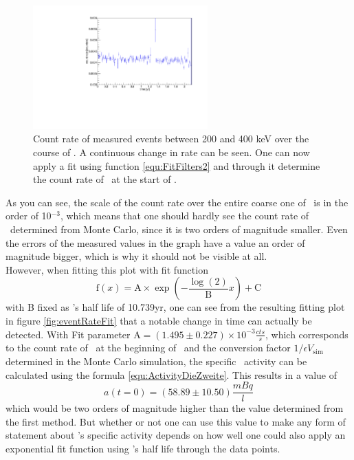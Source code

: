 \begin{figure}
	\centering
	\includegraphics[width=0.6\textwidth]{./Bilder/eventRate.pdf}
	\caption{
		Count rate of measured events between 200 and 400 keV over the course of \PII.
		A continuous change in rate can be seen. 
		One can now apply a fit using function \ref{equ:FitFilters2} and through it determine the count rate of \Kr\ at the start of \PII.
	}
	\label{fig:ChangeInEventRate}
\end{figure}

As you can see, the scale of the count rate over the entire coarse one of \PII\ is in the order of 10$^{-3}$, which means that one should hardly see the count rate of \Kr\ determined from Monte Carlo, since it is two orders of magnitude smaller.
Even the errors of the measured values in the graph have a value an order of magnitude bigger, which is why it should not be visible at all.
\\

However, when fitting this plot with fit function 
\begin{equation}
\mathrm{f}(x) = \mathrm{A}\times\exp\left(-\frac{\log(2)}{\mathrm{B}} x \right) + \mathrm{C}
\label{equ:FitFilters2}
\end{equation}
with B fixed as \Kr's half life of 10.739yr, one can see from the resulting fitting plot in figure \ref{fig:eventRateFit} that a notable change in time can actually be detected.
With Fit parameter A$ = (1.495\pm0.227) \times 10^{-3}\frac{\unit{cts}}{\unit{s}}$, which corresponds to the count rate of \Kr\ at the beginning of \PII\, and the conversion factor $1/\epsilon V_{\mathrm{sim}}$ determined in the Monte Carlo simulation, the specific \Kr\ activity can be calculated using the formula \ref{equ:ActivityDieZweite}.
This results in a value of
\begin{equation*}
a(t = 0) = (58.89\pm10.50) \frac{\unit{mBq}}{\unit{l}}
\end{equation*}
which would be two orders of magnitude higher than the value determined from the first method.
But whether or not one can use this value to make any form of statement about \Kr's specific activity  depends on how well one could also apply an exponential fit function using 's half life through the data points.
\\

